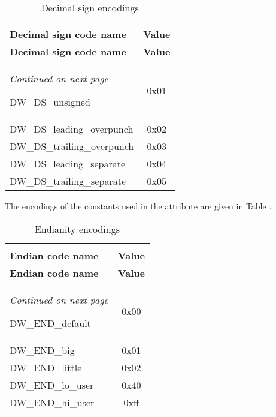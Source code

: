 \begin{centering}
\setlength{\extrarowheight}{0.1cm}
\begin{longtable}{l|c}
  \caption{Decimal sign encodings} \label{tab:decimalsignencodings} \\
  \hline \\ \bfseries Decimal sign code name&\bfseries Value \\ \hline
\endfirsthead
  \bfseries Decimal sign code name&\bfseries Value\\ \hline
\endhead
  \hline \emph{Continued on next page}
\endfoot
  \hline
\endlastfoot

DW\-\_DS\-\_unsigned & 0x01  \\
DW\-\_DS\-\_leading\-\_overpunch & 0x02  \\
DW\-\_DS\-\_trailing\-\_overpunch & 0x03  \\
DW\-\_DS\-\_leading\-\_separate & 0x04  \\
DW\-\_DS\-\_trailing\-\_separate & 0x05  \\

\end{longtable}
\end{centering}

The encodings of the constants used in the 
 attribute are given in 
Table .

\begin{centering}
\setlength{\extrarowheight}{0.1cm}
\begin{longtable}{l|c}
  \caption{Endianity encodings} \label{tab:endianityencodings}\\
  \hline \\ \bfseries Endian code name&\bfseries Value \\ \hline
\endfirsthead
  \bfseries Endian code name&\bfseries Value\\ \hline
\endhead
  \hline \emph{Continued on next page}
\endfoot
  \hline
\endlastfoot

DW\-\_END\-\_default  & 0x00 \\
DW\-\_END\-\_big & 0x01 \\
DW\-\_END\-\_little & 0x02 \\
DW\-\_END\-\_lo\-\_user & 0x40 \\
DW\-\_END\-\_hi\-\_user & 0xff \\

\end{longtable}
\end{centering}

